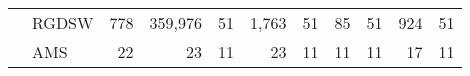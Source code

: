 \begin{table}[H]
\begin{tabular}{llrrrrrrrrr}
\cline{2-11}
\bfseries  & RGDSW & 778 & {\cellcolor[HTML]{E2E4FB}} \color[HTML]{000000} 359,976 & 51 & {\cellcolor[HTML]{ACB8F4}} \color[HTML]{000000} 1,763 & 51 & {\cellcolor[HTML]{768BEC}} \color[HTML]{F1F1F1} 85 & 51 & {\cellcolor[HTML]{405FE5}} \color[HTML]{F1F1F1} 924 & 51 \\
\cline{2-11}
\bfseries  & AMS & 22 & {\cellcolor[HTML]{405FE5}} \color[HTML]{F1F1F1} 23 & 11 & {\cellcolor[HTML]{405FE5}} \color[HTML]{F1F1F1} 23 & 11 & {\cellcolor[HTML]{E2E4FB}} \color[HTML]{000000} 11 & 11 & {\cellcolor[HTML]{91A1F0}} \color[HTML]{F1F1F1} 17 & 11 \\
\cline{1-11} \cline{2-11}
\bottomrule
\end{tabular}
\end{table}
